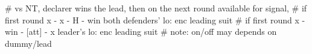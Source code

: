 # vs NT, declarer wins the lead, then on the next round available for signal,
# if first round x - x - H - win
both defenders' lo: enc leading suit
# if first round x - win - [att] - x
leader's lo: enc leading suit
# note: on/off may depends on dummy/lead